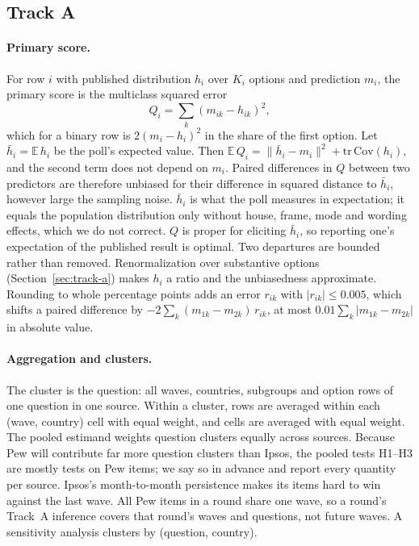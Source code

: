 \documentclass[11pt]{article}
\begin{document}
\subsection{Track A}
\label{sec:metrics-a}

\paragraph{Primary score.} For row $i$ with published distribution $h_i$ over $K_i$ options and prediction $m_i$, the primary score is the multiclass squared error
\begin{equation}
Q_i = \textstyle\sum_k (m_{ik} - h_{ik})^2 ,
\end{equation}
which for a binary row is $2(m_i - h_i)^2$ in the share of the first option. Let $\bar h_i = \mathbb{E}\,h_i$ be the poll's expected value. Then $\mathbb{E}\,Q_i = \|\bar h_i - m_i\|^2 + \mathrm{tr}\,\mathrm{Cov}(h_i)$, and the second term does not depend on $m_i$. Paired differences in $Q$ between two predictors are therefore unbiased for their difference in squared distance to $\bar h_i$, however large the sampling noise. $\bar h_i$ is what the poll measures in expectation; it equals the population distribution only without house, frame, mode and wording effects, which we do not correct. $Q$ is proper for eliciting $\bar h_i$, so reporting one's expectation of the published result is optimal. Two departures are bounded rather than removed. Renormalization over substantive options (Section~\ref{sec:track-a}) makes $h_i$ a ratio and the unbiasedness approximate. Rounding to whole percentage points adds an error $r_{ik}$ with $|r_{ik}| \le 0.005$, which shifts a paired difference by $-2\sum_k (m_{1k} - m_{2k})\, r_{ik}$, at most $0.01 \sum_k |m_{1k} - m_{2k}|$ in absolute value.

\paragraph{Aggregation and clusters.} The cluster is the question: all waves, countries, subgroups and option rows of one question in one source. Within a cluster, rows are averaged within each (wave, country) cell with equal weight, and cells are averaged with equal weight. The pooled estimand weights question clusters equally across sources. Because Pew will contribute far more question clusters than Ipsos, the pooled tests H1--H3 are mostly tests on Pew items; we say so in advance and report every quantity per source. Ipsos's month-to-month persistence makes its items hard to win against the last wave. All Pew items in a round share one wave, so a round's Track~A inference covers that round's waves and questions, not future waves. A sensitivity analysis clusters by (question, country).
\end{document}
